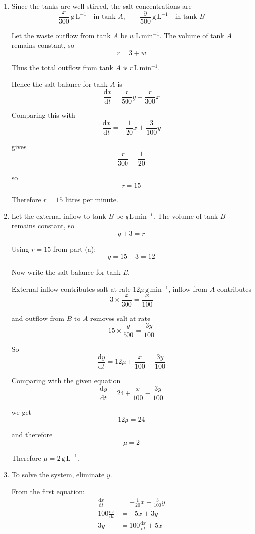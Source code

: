\documentclass[leqno]{article}
\begin{document}
\begin{enumerate}[
  label=\textbf{\arabic*.},
  leftmargin=*,
  topsep=0pt,
  partopsep=0pt,
  parsep=0pt
]
\vspace*{10pt}

\begin{djsSolution}
\begin{enumerate}[label=\textbf{(\alph*)}]
  \item Since the tanks are well stirred, the salt concentrations are
\[
\frac{x}{300}\,\mathrm{g\,L}^{-1} \quad \text{in tank }A,
\qquad
\frac{y}{500}\,\mathrm{g\,L}^{-1} \quad \text{in tank }B
\]

Let the waste outflow from tank $A$ be $w\,\mathrm{L\,min^{-1}}$. The volume of tank $A$ remains constant, so
\[
r = 3 + w
\]

Thus the total outflow from tank $A$ is $r\,\mathrm{L\,min^{-1}}$.

Hence the salt balance for tank $A$ is
\[
\frac{\mathrm{d}x}{\mathrm{d}t}=\frac{r}{500}y-\frac{r}{300}x
\]

Comparing this with
\[
\frac{\mathrm{d}x}{\mathrm{d}t}=-\frac{1}{20}x+\frac{3}{100}y
\]

gives
\[
\frac{r}{300}=\frac{1}{20}
\]

so
\[
r=15
\]

Therefore $r=15$ litres per minute.

  \item Let the external inflow to tank $B$ be $q\,\mathrm{L\,min^{-1}}$. The volume of tank $B$ remains constant, so
\[
q+3=r
\]

Using $r=15$ from part (a):
\[
q=15-3=12
\]

Now write the salt balance for tank $B$.

External inflow contributes salt at rate $12\mu\,\mathrm{g\,min^{-1}}$, inflow from $A$ contributes
\[
3\times \frac{x}{300}=\frac{x}{100}
\]

and outflow from $B$ to $A$ removes salt at rate
\[
15\times \frac{y}{500}=\frac{3y}{100}
\]

So
\[
\frac{\mathrm{d}y}{\mathrm{d}t}=12\mu+\frac{x}{100}-\frac{3y}{100}
\]

Comparing with the given equation
\[
\frac{\mathrm{d}y}{\mathrm{d}t}=24+\frac{x}{100}-\frac{3y}{100}
\]

we get
\[
12\mu=24
\]

and therefore
\[
\mu=2
\]

Therefore $\mu=2\,\mathrm{g\,L}^{-1}$.

  \item To solve the system, eliminate $y$.

From the first equation:
\begin{align*}
\frac{\mathrm{d}x}{\mathrm{d}t} &= -\frac{1}{20}x+\frac{3}{100}y \\
100\frac{\mathrm{d}x}{\mathrm{d}t} &= -5x+3y \\
3y &= 100\frac{\mathrm{d}x}{\mathrm{d}t}+5x
\end{align*}


\end{enumerate}
\end{djsSolution}
\end{enumerate}
\end{document}
